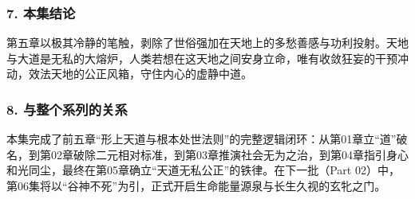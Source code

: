 \subsubsection{7. 本集结论}
第五章以极其冷静的笔触，剥除了世俗强加在天地上的多愁善感与功利投射。天地与大道是无私的大熔炉，人类若想在这天地之间安身立命，唯有收敛狂妄的干预冲动，效法天地的公正风箱，守住内心的虚静中道。

\subsubsection{8. 与整个系列的关系}
本集完成了前五章“形上天道与根本处世法则”的完整逻辑闭环：从第01章立“道”破名，到第02章破除二元相对标准，到第03章推演社会无为之治，到第04章指引身心和光同尘，最终在第05章确立“天道无私公正”的铁律。在下一批（Part 02）中，第06集将以“谷神不死”为引，正式开启生命能量源泉与长生久视的玄牝之门。
